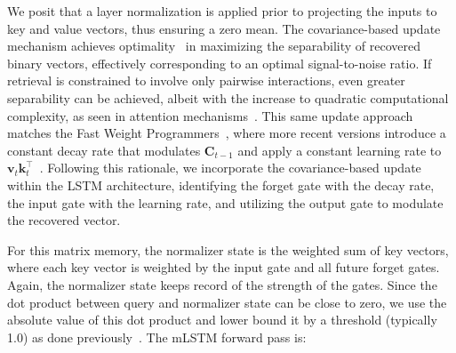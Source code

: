 We posit that a layer normalization is applied prior to projecting the inputs to key and value vectors, thus ensuring a zero mean. The covariance-based update mechanism achieves optimality~\citep{Dayan:91} in maximizing the separability of recovered binary vectors, effectively corresponding to an optimal signal-to-noise ratio. If retrieval is constrained to involve only pairwise interactions, even greater separability can be achieved, albeit with the increase to quadratic computational complexity, as seen in attention mechanisms~\citep{Krotov:16,Krotov:17,Ramsauer:21}. This same update approach matches the Fast Weight Programmers~\citep{Schmidhuber:92ncfastweights,Schlag:21}, where more recent versions introduce a constant decay rate that modulates $\mathbf{C}_{t-1}$ and apply a constant learning rate to 
$\mathbf{v}_{t} \mathbf{k}_t ^\top$~\citep{Ba:16}. Following this rationale, we incorporate the covariance-based update within the LSTM architecture, identifying the forget gate with the decay rate, the input gate with the learning rate, and utilizing the output gate to modulate the recovered vector.

For this matrix memory, the normalizer state is the weighted sum of key vectors, where each key vector is weighted by the input gate and all future forget gates. Again, the normalizer state keeps record of the strength of the gates. Since the dot product between query and normalizer state can be close to zero, we use the absolute value of this dot product and lower bound it by a threshold (typically 1.0) as done previously~\citep{Sun:23arxiv}. The mLSTM forward pass is:

